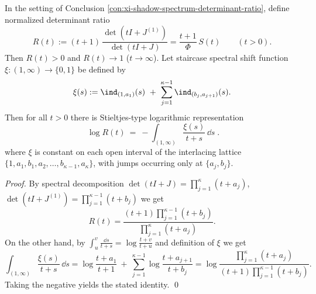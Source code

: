 \begin{proposition}\label{prop:xi-krein-spectral-shift-staircase-shadow}
In the setting of Conclusion \ref{con:xi-shadow-spectrum-determinant-ratio}, define normalized determinant ratio
\[
R(t):=(t+1)\,\frac{\det(tI+J^{(1)})}{\det(tI+J)}
=\frac{t+1}{\Phi}\,S(t)\qquad (t>0).
\]
Then \(R(t)>0\) and \(R(t)\to 1\) (\(t\to\infty\)).
Let staircase spectral shift function \(\xi:(1,\infty)\to\{0,1\}\) be defined by
\[
\xi(s):=\ind_{(1,a_1)}(s)\ +\ \sum_{j=1}^{\kappa-1}\ind_{(b_j,a_{j+1})}(s).
\]
Then for all \(t>0\) there is Stieltjes-type logarithmic representation
\[
\boxed{\;
\log R(t)\ =\ -\int_{(1,\infty)}\frac{\xi(s)}{t+s}\,\dd s\; }.
\]
where \(\xi\) is constant on each open interval of the interlacing lattice \(\{1,a_1,b_1,a_2,\dots,b_{\kappa-1},a_\kappa\}\), with jumps occurring only at \(\{a_j,b_j\}\).
\end{proposition}
\begin{proof}
By spectral decomposition
\(
\det(tI+J)=\prod_{j=1}^{\kappa}(t+a_j)
\),
\(
\det(tI+J^{(1)})=\prod_{j=1}^{\kappa-1}(t+b_j)
\)
we get
\[
R(t)=\frac{(t+1)\prod_{j=1}^{\kappa-1}(t+b_j)}{\prod_{j=1}^{\kappa}(t+a_j)}.
\]
On the other hand, by
\(
\int_{u}^{v}\frac{\dd s}{t+s}=\log\frac{t+v}{t+u}
\)
and definition of \(\xi\) we get
\[
\int_{(1,\infty)}\frac{\xi(s)}{t+s}\,\dd s
=\log\frac{t+a_1}{t+1}
\ +\ \sum_{j=1}^{\kappa-1}\log\frac{t+a_{j+1}}{t+b_j}
=\log\frac{\prod_{j=1}^{\kappa}(t+a_j)}{(t+1)\prod_{j=1}^{\kappa-1}(t+b_j)}.
\]
Taking the negative yields the stated identity. \qed
\end{proof}

